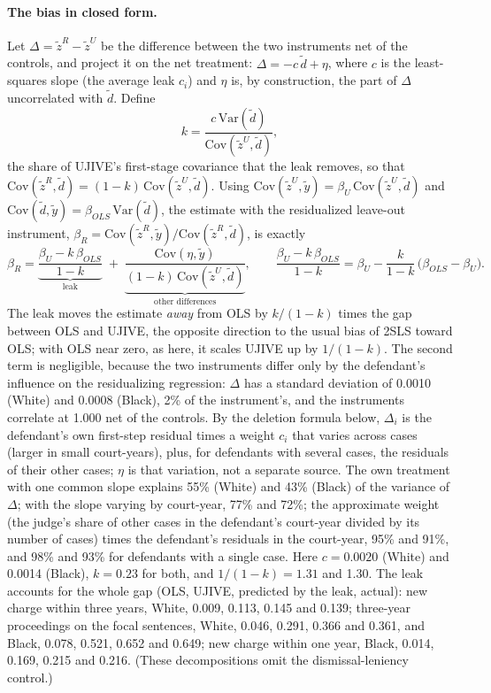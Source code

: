 \documentclass[11pt]{article}
\begin{document}
\paragraph{The bias in closed form.} Let $\Delta = \tilde z^R - \tilde z^U$ be the difference between the two instruments net of the controls, and project it on the net treatment: $\Delta = -c\,\tilde d + \eta$, where $c$ is the least-squares slope (the average leak $c_i$) and $\eta$ is, by construction, the part of $\Delta$ uncorrelated with $\tilde d$. Define
\begin{equation*}
k = \frac{c\,\mathrm{Var}(\tilde d)}{\mathrm{Cov}(\tilde z^U, \tilde d)},
\end{equation*}
the share of UJIVE's first-stage covariance that the leak removes, so that $\mathrm{Cov}(\tilde z^R, \tilde d) = (1-k)\,\mathrm{Cov}(\tilde z^U, \tilde d)$. Using $\mathrm{Cov}(\tilde z^U, \tilde y) = \beta_U\,\mathrm{Cov}(\tilde z^U, \tilde d)$ and $\mathrm{Cov}(\tilde d, \tilde y) = \beta_{OLS}\,\mathrm{Var}(\tilde d)$, the estimate with the residualized leave-out instrument, $\beta_R = \mathrm{Cov}(\tilde z^R, \tilde y)/\mathrm{Cov}(\tilde z^R, \tilde d)$, is exactly
\begin{equation*}
\beta_R = \underbrace{\frac{\beta_U - k\,\beta_{OLS}}{1-k}}_{\text{leak}} \;+\; \underbrace{\frac{\mathrm{Cov}(\eta, \tilde y)}{(1-k)\,\mathrm{Cov}(\tilde z^U, \tilde d)}}_{\text{other differences}},
\qquad
\frac{\beta_U - k\,\beta_{OLS}}{1-k} = \beta_U - \frac{k}{1-k}\,\bigl(\beta_{OLS} - \beta_U\bigr).
\end{equation*}
The leak moves the estimate \emph{away} from OLS by $k/(1-k)$ times the gap between OLS and UJIVE, the opposite direction to the usual bias of 2SLS toward OLS; with OLS near zero, as here, it scales UJIVE up by $1/(1-k)$. The second term is negligible, because the two instruments differ only by the defendant's influence on the residualizing regression: $\Delta$ has a standard deviation of 0.0010 (White) and 0.0008 (Black), 2\% of the instrument's, and the instruments correlate at 1.000 net of the controls. By the deletion formula below, $\Delta_i$ is the defendant's own first-step residual times a weight $c_i$ that varies across cases (larger in small court-years), plus, for defendants with several cases, the residuals of their other cases; $\eta$ is that variation, not a separate source. The own treatment with one common slope explains 55\% (White) and 43\% (Black) of the variance of $\Delta$; with the slope varying by court-year, 77\% and 72\%; the approximate weight (the judge's share of other cases in the defendant's court-year divided by its number of cases) times the defendant's residuals in the court-year, 95\% and 91\%, and 98\% and 93\% for defendants with a single case. Here $c = 0.0020$ (White) and 0.0014 (Black), $k = 0.23$ for both, and $1/(1-k) = 1.31$ and 1.30. The leak accounts for the whole gap (OLS, UJIVE, predicted by the leak, actual): new charge within three years, White, 0.009, 0.113, 0.145 and 0.139; three-year proceedings on the focal sentences, White, 0.046, 0.291, 0.366 and 0.361, and Black, 0.078, 0.521, 0.652 and 0.649; new charge within one year, Black, 0.014, 0.169, 0.215 and 0.216. (These decompositions omit the dismissal-leniency control.)
\end{document}
